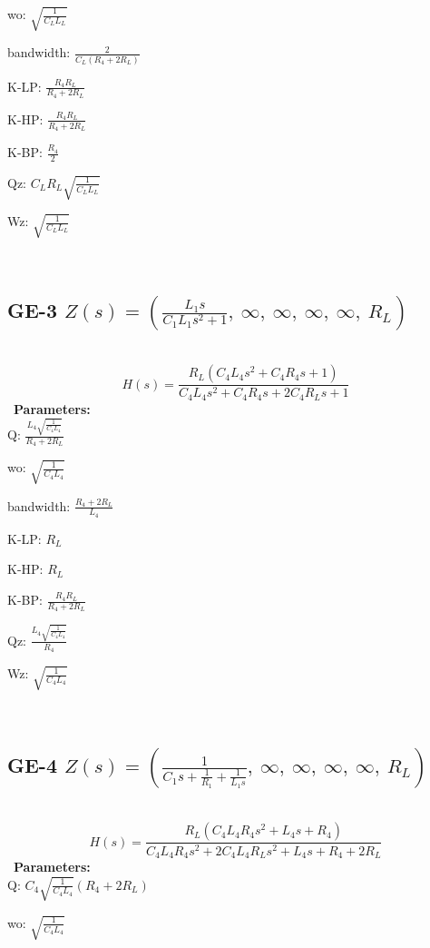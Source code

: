 \documentclass{article}
\begin{document}
wo: $\sqrt{\frac{1}{C_{L} L_{L}}}$\ 

bandwidth: $\frac{2}{C_{L} \left(R_{4} + 2 R_{L}\right)}$\ 

K-LP: $\frac{R_{4} R_{L}}{R_{4} + 2 R_{L}}$\ 

K-HP: $\frac{R_{4} R_{L}}{R_{4} + 2 R_{L}}$\ 

K-BP: $\frac{R_{4}}{2}$\ 

Qz: $C_{L} R_{L} \sqrt{\frac{1}{C_{L} L_{L}}}$\ 

Wz: $\sqrt{\frac{1}{C_{L} L_{L}}}$\ 

\ 

\subsection{GE-3 $Z(s) = \left( \frac{L_{1} s}{C_{1} L_{1} s^{2} + 1}, \  \infty, \  \infty, \  \infty, \  \infty, \  R_{L}\right)$ } \ 
\textbf{\[H(s) = \frac{R_{L} \left(C_{4} L_{4} s^{2} + C_{4} R_{4} s + 1\right)}{C_{4} L_{4} s^{2} + C_{4} R_{4} s + 2 C_{4} R_{L} s + 1}\] } \ 
\textbf{Parameters:}\\ 

Q: $\frac{L_{4} \sqrt{\frac{1}{C_{4} L_{4}}}}{R_{4} + 2 R_{L}}$\ 

wo: $\sqrt{\frac{1}{C_{4} L_{4}}}$\ 

bandwidth: $\frac{R_{4} + 2 R_{L}}{L_{4}}$\ 

K-LP: $R_{L}$\ 

K-HP: $R_{L}$\ 

K-BP: $\frac{R_{4} R_{L}}{R_{4} + 2 R_{L}}$\ 

Qz: $\frac{L_{4} \sqrt{\frac{1}{C_{4} L_{4}}}}{R_{4}}$\ 

Wz: $\sqrt{\frac{1}{C_{4} L_{4}}}$\ 

\ 

\subsection{GE-4 $Z(s) = \left( \frac{1}{C_{1} s + \frac{1}{R_{1}} + \frac{1}{L_{1} s}}, \  \infty, \  \infty, \  \infty, \  \infty, \  R_{L}\right)$ } \ 
\textbf{\[H(s) = \frac{R_{L} \left(C_{4} L_{4} R_{4} s^{2} + L_{4} s + R_{4}\right)}{C_{4} L_{4} R_{4} s^{2} + 2 C_{4} L_{4} R_{L} s^{2} + L_{4} s + R_{4} + 2 R_{L}}\] } \ 
\textbf{Parameters:}\\ 

Q: $C_{4} \sqrt{\frac{1}{C_{4} L_{4}}} \left(R_{4} + 2 R_{L}\right)$\ 

wo: $\sqrt{\frac{1}{C_{4} L_{4}}}$\ 
\end{document}
